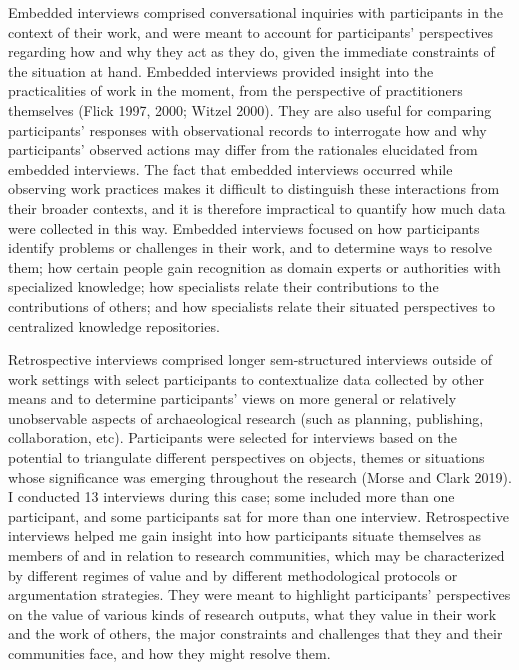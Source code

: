 \documentclass[
]{article}
\begin{document}
Embedded interviews comprised conversational inquiries with participants
in the context of their work, and were meant to account for
participants' perspectives regarding how and why they act as they do,
given the immediate constraints of the situation at hand. Embedded
interviews provided insight into the practicalities of work in the
moment, from the perspective of practitioners themselves (Flick 1997,
2000; Witzel 2000). They are also useful for comparing participants'
responses with observational records to interrogate how and why
participants' observed actions may differ from the rationales elucidated
from embedded interviews. The fact that embedded interviews occurred
while observing work practices makes it difficult to distinguish these
interactions from their broader contexts, and it is therefore
impractical to quantify how much data were collected in this way.
Embedded interviews focused on how participants identify problems or
challenges in their work, and to determine ways to resolve them; how
certain people gain recognition as domain experts or authorities with
specialized knowledge; how specialists relate their contributions to the
contributions of others; and how specialists relate their situated
perspectives to centralized knowledge repositories.

Retrospective interviews comprised longer sem-structured interviews
outside of work settings with select participants to contextualize data
collected by other means and to determine participants' views on more
general or relatively unobservable aspects of archaeological research
(such as planning, publishing, collaboration, etc). Participants were
selected for interviews based on the potential to triangulate different
perspectives on objects, themes or situations whose significance was
emerging throughout the research (Morse and Clark 2019). I conducted 13
interviews during this case; some included more than one participant,
and some participants sat for more than one interview. Retrospective
interviews helped me gain insight into how participants situate
themselves as members of and in relation to research communities, which
may be characterized by different regimes of value and by different
methodological protocols or argumentation strategies. They were meant to
highlight participants' perspectives on the value of various kinds of
research outputs, what they value in their work and the work of others,
the major constraints and challenges that they and their communities
face, and how they might resolve them.
\end{document}
